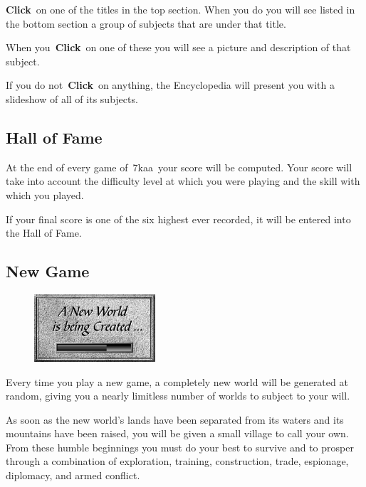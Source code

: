 \textbf{Click} on one of the titles in the top section. When you do you will see listed in the bottom section a group of subjects that are under that title.

When you \textbf{Click} on one of these you will see a picture and description of that subject.

If you do not \textbf{Click} on anything, the Encyclopedia will present you with a slideshow of all of its subjects.

\subsection{Hall of Fame}

At the end of every game of 7kaa your score will be computed. Your score will take into account the difficulty level at which you were playing and the skill with which you played.

If your final score is one of the six highest ever recorded, it will be entered into the Hall of Fame.

\subsection{New Game}

\begin{figure}
	\begin{center}
		\vspace{-20pt}
		\includegraphics[width=0.4\textwidth]{Inewworld}
	\end{center}
\vspace{-20pt}
\end{figure}

Every time you play a new game, a completely new world will be generated at random, giving you a nearly limitless number of worlds to subject to your will.

As soon as the new world’s lands have been separated from its waters and its mountains have been raised, you will be given a small village to call your own. From these humble beginnings you must do your best to survive and to prosper through a combination of exploration, training, construction, trade, espionage, diplomacy, and armed conflict.


